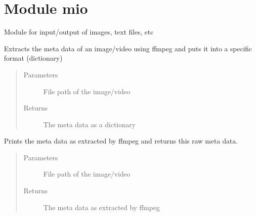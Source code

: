 \documentclass[letterpaper,10pt,english]{sphinxmanual}
\begin{document}
\chapter{Module mio}
\label{\detokenize{index:module-mio}}
Module for input/output of images, text files, etc

\label{\detokenize{index:module-4}}

\begin{fulllineitems}
\label{\detokenize{index:mlpy.mio.get_metadata}}
Extracts the meta data of an image/video using ffmpeg and puts it into a specific format (dictionary)
\begin{quote}\begin{description}
\item[{Parameters}] \leavevmode
{} \textendash{} File path of the image/video

\item[{Returns}] \leavevmode
The meta data as a dictionary

\end{description}\end{quote}

\end{fulllineitems}


\begin{fulllineitems}
\label{\detokenize{index:mlpy.mio.print_metadata}}
Prints the meta data as extracted by ffmpeg and returns this raw meta data.
\begin{quote}\begin{description}
\item[{Parameters}] \leavevmode
{} \textendash{} File path of the image/video

\item[{Returns}] \leavevmode
The meta data as extracted by ffmpeg

\end{description}\end{quote}

\end{fulllineitems}
\end{document}
